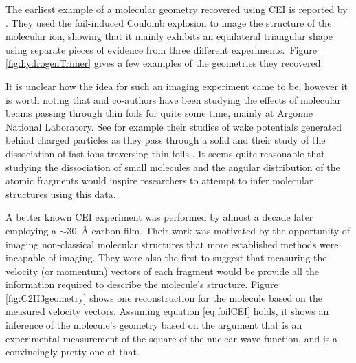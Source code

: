 The earliest example of a molecular geometry recovered using CEI is reported by \citet{Gaillard78}. They used the foil-induced Coulomb explosion to image the structure of the  molecular ion, showing that it mainly exhibits an equilateral triangular shape using separate pieces of evidence from three different experiments.\footnotemark ~Figure \ref{fig:hydrogenTrimer} gives a few examples of the geometries they recovered.


It is unclear how the idea for such an imaging experiment came to be, however it is worth noting that \citet{Gaillard78} and co-authors have been studying the effects of molecular beams passing through thin foils for quite some time, mainly at Argonne National Laboratory. See for example their studies of wake potentials generated behind charged particles as they pass through a solid \citep{Gemmell75, Vager76PRL} and their study of the dissociation of fast  ions traversing thin foils \citep{Vager76PRA}. It seems quite reasonable that studying the dissociation of small molecules and the angular distribution of the atomic fragments would inspire researchers to attempt to infer molecular structures using this data.

A better known CEI experiment was performed by \citet{Vager89} almost a decade later employing a $\sim$\SI{30}{\angstrom} carbon film. Their work was motivated by the opportunity of imaging non-classical molecular structures that more established methods were incapable of imaging. They were also the first to suggest that measuring the velocity (or momentum) vectors of each fragment would be provide all the information required to describe the molecule's structure. Figure \ref{fig:C2H3geometry} shows one reconstruction for the  molecule based on the measured velocity vectors. Assuming equation \eqref{eq:foilCEI} holds, it shows an inference of the molecule's geometry based on the argument that is an experimental measurement of the square of the nuclear wave function, and is a convincingly pretty one at that.

